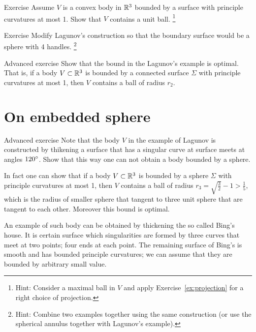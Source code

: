 \begin{thm}{Exercise}
Assume $V$ is a convex body in $\mathbb{R}^3$ bounded by a surface with principle curvatures at most 1.
Show that $V$ contains a unit ball.%
\footnote{Hint: Consider a maximal ball in $V$ and apply Exercise~\ref{ex:projection} for a right choice of projection.}
\end{thm}





\begin{thm}{Exercise}
Modify Lagunov's construction so that the boundary surface would be a sphere with 4 handles.%
\footnote{Hint: Combine two examples together using the same construction (or use the spherical annulus together with Lagunov's example).}
\end{thm}



\begin{thm}{Advanced exercise}
Show that the bound in the Lagunov's example is optimal.
That is, if a body $V\subset \mathbb{R}^3$ is bounded by a connected surface  $\Sigma$ with principle curvatures at most 1, then $V$ contains a ball of radius $r_2$.
\end{thm}

\section{On embedded sphere}


\begin{thm}{Advanced exercise}
Note that the body $V$ in the example of Lagunov is constructed by thikening a surface that has a singular curve at surface meets at angles $120\degree$.
Show that this way one can not obtain a body bounded by a sphere.
\end{thm}

In fact one can show that if a body $V\subset \mathbb{R}^3$ is bounded by a sphere $\Sigma$ with principle curvatures at most 1, then $V$ contains a ball of radius $r_3=\sqrt{\tfrac32}-1>\tfrac15$,
which is the radius of smaller sphere that tangent to three unit sphere that are tangent to each other.
Moreover this bound is optimal.

An example of such body can be obtained by thickening the so called Bing's house.
It is certain surface which singularities are formed by three curves that meet at two points;
four ends at each point.
The remaining surface of Bing's is smooth and has bounded principle curvatures;
we can assume that they are bounded by arbitrary small value.

